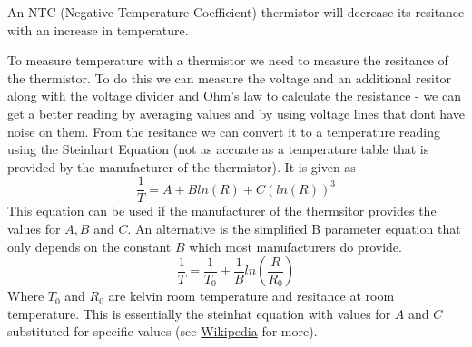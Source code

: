 \documentclass{article}
\begin{document}
	An NTC (Negative Temperature Coefficient) thermistor will decrease its resitance with an increase in temperature.

	To measure temperature with a thermistor we need to measure the resitance of the thermistor. To do this we can measure the voltage and an additional resitor along with the voltage divider and Ohm's law to calculate the resistance - we can get a better reading by averaging values and by using voltage lines that dont have noise on them. From the resitance we can convert it to a temperature reading using the Steinhart Equation (not as accuate as a temperature table that is provided by the manufacturer of the thermistor). It is given as 
	\begin{equation}
		\frac{1}{T} = A + Bln(R) + C(ln(R))^3
	\end{equation}
	This equation can be used if the manufacturer of the thermsitor provides the values for $A, B$ and $C$. An alternative is the simplified B parameter equation that only depends on the constant $B$ which most manufacturers do provide. 
	\begin{equation}
	 	\frac{1}{T} = \frac{1}{T_0} + \frac{1}{B}ln(\frac{R}{R_0})
	 \end{equation} 
	 Where $T_0$ and $R_0$ are kelvin room temperature and resitance at room temperature. This is essentially the steinhat equation with values for $A$ and $C$ substituted for specific values (see \href{https://en.wikipedia.org/wiki/Thermistor}{Wikipedia} for more).
	
\end{document}
